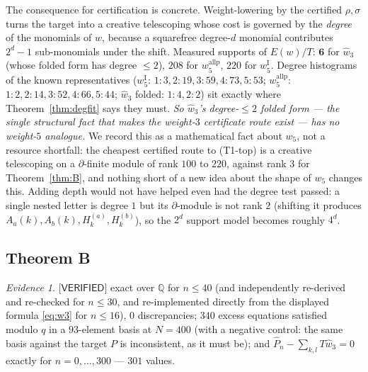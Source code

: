 \documentclass[11pt,reqno]{amsart}
\theoremstyle{plain}
\theoremstyle{definition}
\theoremstyle{remark}
\newtheorem{evidence}[theorem]{Evidence}
\numberwithin{equation}{section}
\newcommand{\QQ}{\mathbb{Q}}
\newcommand{\wfive}{w_5}
\newcommand{\wthree}{\hat w_3}
\newcommand{\VERIFIED}{\textsf{[VERIFIED]}}
\begin{document}
The consequence for certification is concrete. Weight-lowering by the certified $\rho,\sigma$
turns the target into a creative telescoping whose cost is governed by the \emph{degree} of the
monomials of $w$, because a squarefree degree-$d$ monomial contributes $2^d-1$ sub-monomials
under the shift. Measured supports of $E(w)/T$: $\mathbf 6$ for $\wthree$ (whose folded form has
degree $\le2$), $208$ for $w_5^{\mathrm{allp}}$, $220$ for $w_5^{\mathrm I}$. Degree histograms
of the known representatives ($w_5^{\mathrm I}$: $1{:}3,2{:}19,3{:}59,4{:}73,5{:}53$;
$w_5^{\mathrm{allp}}$: $1{:}2,2{:}14,3{:}52,4{:}66,5{:}44$; $\wthree$ folded: $1{:}4,2{:}2$) sit
exactly where Theorem~\ref{thm:degfit} says they must. \emph{So $\wthree$'s degree-$\le2$ folded
form --- the single structural fact that makes the weight-$3$ certificate route exist --- has no
weight-$5$ analogue.} We record this as a mathematical fact about $\wfive$, not a resource
shortfall: the cheapest certified route to (T1-top) is a creative telescoping on a
$\partial$-finite module of rank $100$ to $220$, against rank $3$ for Theorem~\ref{thm:B}, and
nothing short of a new idea about the shape of $\wfive$ changes this. Adding depth would not
have helped even had the degree test passed: a single nested letter is degree $1$ but its
$\partial$-module is not rank $2$ (shifting it produces $A_a(k),A_b(k),H^{(a)}_k,H^{(b)}_k$), so
the $2^d$ support model becomes roughly $4^d$.

\subsection{Theorem B}\label{sec:certsB}

\begin{evidence}\label{ev:B}
$\VERIFIED$ exact over $\QQ$ for $n\le40$ (and independently re-derived and re-checked for
$n\le30$, and re-implemented directly from the displayed formula \eqref{eq:w3} for $n\le16$),
$0$ discrepancies; $340$ excess equations satisfied modulo $q$ in a $93$-element basis at
$N=400$ (with a negative control: the same basis against the target $P$ is inconsistent, as it
must be); and $\hat P_n-\sum_{k,l}T\wthree=0$ exactly for $n=0,\dots,300$ --- $301$ values.
\end{evidence}
\end{document}
